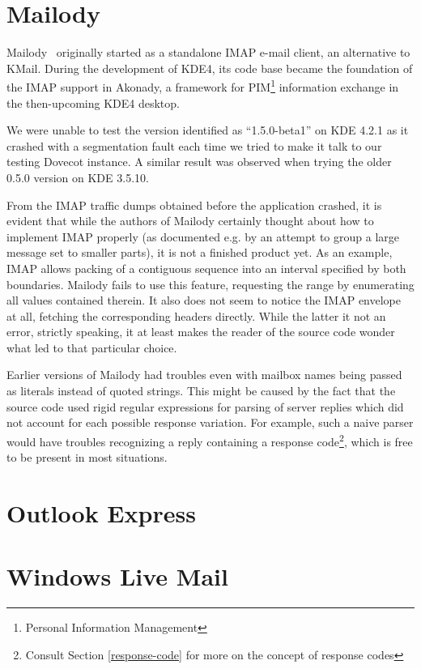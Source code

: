 \documentclass[12pt,notitlepage]{report}
\begin{document}
\section{Mailody}

Mailody~\cite{mailody} originally started as a standalone IMAP e-mail client, an
alternative to KMail.  During the development of KDE4, its code base became the
foundation of the IMAP support in Akonady, a framework for PIM\footnote{Personal
Information Management} information exchange in the then-upcoming KDE4 desktop.

We were unable to test the version identified as ``1.5.0-beta1'' on KDE 4.2.1 as
it crashed with a segmentation fault each time we tried to make it talk to our
testing Dovecot instance.  A similar result was observed when trying the older
0.5.0 version on KDE 3.5.10.

From the IMAP traffic dumps obtained before the application crashed, it is
evident that while the authors of Mailody certainly thought about how to
implement IMAP properly (as documented e.g.  by an attempt to group a large
message set to smaller parts), it is not a finished product yet.  As an example,
IMAP allows packing of a contiguous sequence into an interval specified by both
boundaries.  Mailody fails to use this feature, requesting the range by
enumerating all values contained therein.  It also does not seem to notice the
IMAP envelope at all, fetching the corresponding headers directly.  While the
latter it not an error, strictly speaking, it at least makes the reader of the
source code wonder what led to that particular choice.

Earlier versions of Mailody had troubles even with mailbox names being passed as
literals instead of quoted strings.  This might be caused by the fact that the
source code used rigid regular expressions for parsing of server replies which
did not account for each possible response variation.  For example, such a naive
parser would have troubles recognizing a reply containing a response
code\footnote{Consult Section \ref{response-code} for more on the concept of
response codes}, which is free to be present in most situations.

\section{Outlook Express}


\section{Windows Live Mail}
\end{document}
